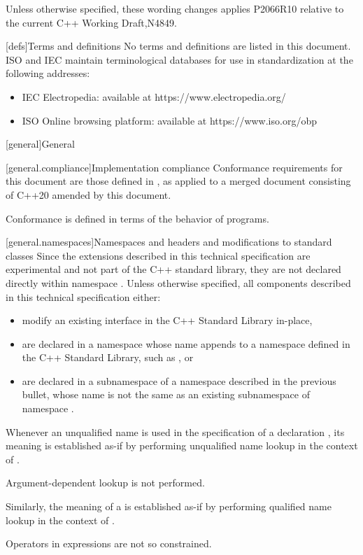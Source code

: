 \pnum
Unless otherwise specified, these wording changes applies P2066R10 relative to the current C++ Working Draft,N4849.


[defs]{Terms and definitions}
\pnum
{}%
No terms and definitions are listed in this document. ISO and IEC maintain
terminological databases for use in standardization at the following addresses:

\begin{itemize}
    \item IEC Electropedia: available at https://www.electropedia.org/
    \item ISO Online browsing platform: available at https://www.iso.org/obp
\end{itemize}

[general]{General}

[general.compliance]{Implementation compliance}
\pnum
Conformance requirements for this document are those defined in , as applied to a merged document consisting of C++20 amended by this document.
\begin{note}
Conformance is defined in terms of the behavior of programs.
\end{note}

[general.namespaces]{Namespaces and headers and modifications to standard classes}
\pnum
Since the extensions described in this technical specification are experimental and not part of the C++ standard library, they are not declared directly within namespace . Unless otherwise specified, all components described in this technical specification either:

\begin{itemize}
    \item modify an existing interface in the C++ Standard Library in-place,
    \item are declared in a namespace whose name appends  to a namespace defined in the C++ Standard Library, such as , or
    \item are declared in a subnamespace of a namespace described in the previous bullet, whose name is not the same as an existing subnamespace of namespace .
\end{itemize}

\pnum
Whenever an unqualified name is used
in the specification of a declaration ,
its meaning is established
as-if by performing unqualified name lookup
in the context of .
\begin{note}
Argument-dependent lookup is not performed.
\end{note}
Similarly, the meaning of a  is established
as-if by performing qualified name lookup
in the context of .
\begin{note}
Operators in expressions are not so constrained.
\end{note}

